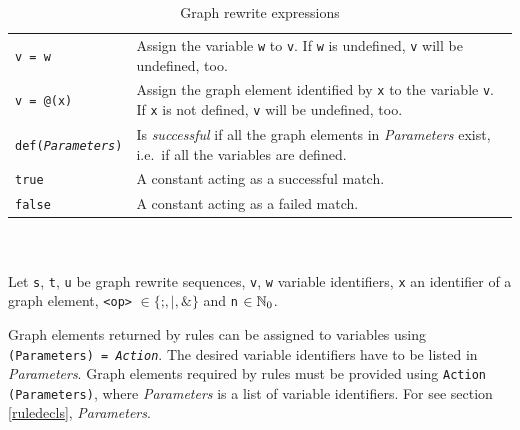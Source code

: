 \begin{table}[htbp]
\begin{minipage}{\linewidth}
\begin{tabularx}{\linewidth}{|lX|}
\texttt{v = w}	& Assign the variable \texttt{w} to \texttt{v}. If \texttt{w} is undefined, \texttt{v} will be undefined, too.\\
\texttt{v = @(x)}	& Assign the graph element identified by \texttt{x} to the variable \texttt{v}. If \texttt{x} is not defined, \texttt{v} will be undefined, too.\\
\texttt{def(\emph{Parameters})} & Is \emph{successful} if all the graph elements in \emph{Parameters} exist, i.e.\ if all the variables are defined.\\
\texttt{true}	& A constant acting as a successful match.\\
\texttt{false}	& A constant acting as a failed match.\\ \hline
\end{tabularx}\indexmain{\texttt{;}}
\indexmain{\texttt{\&}}\indexmain{\texttt{*}}
\end{minipage}\\
\\ 
{\small Let \texttt{s}, \texttt{t}, \texttt{u} be graph rewrite sequences, \texttt{v}, \texttt{w} variable identifiers, \texttt{x} an identifier of a graph element, \texttt{<op>} $\in \{\texttt{;}, \texttt{|}, \texttt{\&}\}$ and \texttt{n} $\in \mathbb{N}_0$.}
\caption{Graph rewrite expressions}
\label{ruletab}
\end{table}
\makeatother

Graph elements returned by rules can be assigned to variables using \texttt{(Para\-meters) = \emph{Action}}. 
The desired variable identifiers have to be listed in \emph{Parameters}. 
Graph elements required by rules must be provided using \texttt{Action (Para\-meters)}, where \emph{Parameters} is a list of variable identifiers. 
For  see section \ref{ruledecls}, \emph{Parameters}.

